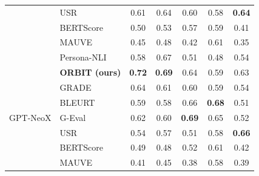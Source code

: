 \documentclass[11pt]{article}
\begin{document}
\begin{longtable}{llccccc}
& USR &
\cellcolor{yellow!25}0.61 &
\cellcolor{green!15}0.64 &
\cellcolor{yellow!20}0.60 &
\cellcolor{yellow!25}0.58 &
\cellcolor{green!25}\textbf{0.64} \\

& BERTScore &
\cellcolor{red!15}0.50 &
\cellcolor{red!20}0.53 &
\cellcolor{yellow!25}0.57 &
\cellcolor{yellow!20}0.59 &
\cellcolor{red!20}0.41 \\

& MAUVE &
\cellcolor{red!25}0.45 &
\cellcolor{red!30}0.48 &
\cellcolor{red!25}0.42 &
\cellcolor{yellow!15}0.61 &
\cellcolor{red!30}0.35 \\

& Persona-NLI &
\cellcolor{yellow!25}0.58 &
\cellcolor{green!15}0.67 &
\cellcolor{red!20}0.51 &
\cellcolor{red!20}0.48 &
\cellcolor{yellow!25}0.54 \\
\midrule
\multirow{8}{*}{GPT-NeoX} 
& \textbf{ORBIT (ours)} &
\cellcolor{green!30}\textbf{0.72} &
\cellcolor{green!30}\textbf{0.69} &
\cellcolor{yellow!25}0.64 &
\cellcolor{yellow!15}0.59 &
\cellcolor{yellow!25}0.63 \\

& GRADE &
\cellcolor{green!15}0.64 &
\cellcolor{green!15}0.61 &
\cellcolor{yellow!25}0.60 &
\cellcolor{yellow!15}0.59 &
\cellcolor{yellow!15}0.54 \\

& BLEURT &
\cellcolor{yellow!25}0.59 &
\cellcolor{yellow!25}0.58 &
\cellcolor{green!15}0.66 &
\cellcolor{green!15}\textbf{0.68} &
\cellcolor{red!20}0.51 \\

& G-Eval &
\cellcolor{green!15}0.62 &
\cellcolor{green!15}0.60 &
\cellcolor{green!30}\textbf{0.69} &
\cellcolor{green!15}0.65 &
\cellcolor{red!20}0.52 \\

& USR &
\cellcolor{yellow!15}0.54 &
\cellcolor{yellow!25}0.57 &
\cellcolor{red!20}0.51 &
\cellcolor{yellow!15}0.58 &
\cellcolor{green!25}\textbf{0.66} \\

& BERTScore &
\cellcolor{red!20}0.49 &
\cellcolor{red!20}0.48 &
\cellcolor{red!20}0.52 &
\cellcolor{yellow!25}0.61 &
\cellcolor{red!40}0.42 \\

& MAUVE &
\cellcolor{red!40}0.41 &
\cellcolor{red!40}0.45 &
\cellcolor{red!40}0.38 &
\cellcolor{yellow!25}0.58 &
\cellcolor{red!40}0.39 \\


\end{longtable}
\end{document}
